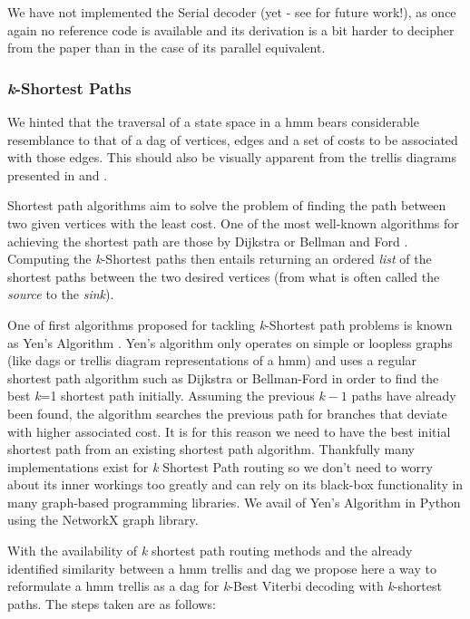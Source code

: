 {{{{{{{{We have not implemented the Serial decoder (yet - see  for future work!), as once again no reference code is available and its derivation is a bit harder to decipher from the paper than in the case of its parallel equivalent.

\subsubsection{\textit{k}-Shortest Paths}

We hinted that the traversal of a state space in a \acrshort{hmm} bears considerable resemblance to that of a \acrfull{dag} of vertices, edges and a set of costs to be associated with those edges. This should also be visually apparent from the trellis diagrams presented in  and .

Shortest path algorithms aim to solve the problem of finding the path between two given vertices with the least cost. One of the most well-known algorithms for achieving the shortest path are those by Dijkstra or Bellman and Ford \citep{Russell2002}. Computing the \textit{k}-Shortest paths then entails returning an ordered \textit{list} of the shortest paths between the two desired vertices (from what is often called the \textit{source} to the \textit{sink}).

One of first algorithms proposed for tackling \textit{k}-Shortest path problems is known as Yen's Algorithm \citep{Yen1971}. Yen's algorithm only operates on simple or loopless graphs (like \acrshort{dag}s or trellis diagram representations of a \acrshort{hmm}) and uses a regular shortest path algorithm such as Dijkstra or Bellman-Ford in order to find the best \textit{k}=1 shortest path initially. Assuming the previous $k-1$ paths have already been found, the algorithm searches the previous path for branches that deviate with higher associated cost. It is for this reason we need to have the best initial shortest path from an existing shortest path algorithm. Thankfully many implementations exist for \textit{k} Shortest Path routing so we don't need to worry about its inner workings too greatly and can rely on its black-box functionality in many graph-based programming libraries. We avail of Yen's Algorithm in Python using the NetworkX \cite{Hagberg2008} graph library. 

With the availability of \textit{k} shortest path routing methods and the already identified similarity between a \acrshort{hmm} trellis and \acrshort{dag} we propose here a way to reformulate a \acrshort{hmm} trellis as a \acrshort{dag} for \textit{k}-Best Viterbi decoding with \textit{k}-shortest paths. The steps taken are as follows:

}}}}}}}}
